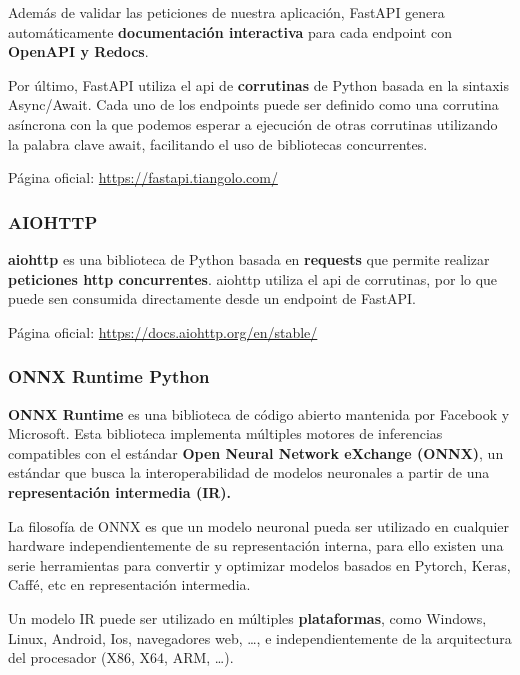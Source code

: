 Además de validar las peticiones de nuestra aplicación, FastAPI genera
automáticamente \textbf{documentación interactiva} para cada endpoint
con \textbf{OpenAPI y Redocs}.

Por último, FastAPI utiliza el api de \textbf{corrutinas} de Python
basada en la sintaxis Async/Await. Cada uno de los endpoints puede ser
definido como una corrutina asíncrona con la que podemos esperar a
ejecución de otras corrutinas utilizando la palabra clave await,
facilitando el uso de bibliotecas concurrentes.

Página oficial: \href{https://fastapi.tiangolo.com/}{https://fastapi.tiangolo.com/}

\hypertarget{aiohttp}{%
\subsubsection{AIOHTTP}\label{aiohttp}}

\textbf{aiohttp} es una biblioteca de Python basada en \textbf{requests}
que permite realizar \textbf{peticiones http concurrentes}. aiohttp
utiliza el api de corrutinas, por lo que puede sen consumida
directamente desde un endpoint de FastAPI.

Página oficial: \href{https://docs.aiohttp.org/en/stable/}{https://docs.aiohttp.org/en/stable/}


\hypertarget{onnx-runtime-python}{%
\subsubsection{ONNX Runtime Python}\label{onnx-runtime-python}}

\textbf{ONNX Runtime} \cite{onnxruntime} es una biblioteca de código abierto mantenida por
Facebook y Microsoft. Esta biblioteca implementa múltiples motores de
inferencias compatibles con el estándar \textbf{Open Neural Network
eXchange (ONNX)}, un estándar que busca la interoperabilidad de modelos
neuronales a partir de una \textbf{representación intermedia (IR).}

La filosofía de ONNX es que un modelo neuronal pueda ser utilizado en
cualquier hardware independientemente de su representación interna, para
ello existen una serie herramientas para convertir y optimizar modelos
basados en Pytorch, Keras, Caffé, etc en representación intermedia.

Un modelo IR puede ser utilizado en múltiples \textbf{plataformas}, como Windows, Linux, Android, Ios, navegadores web, \ldots, e independientemente de la arquitectura del procesador (X86, X64, ARM, \ldots).

